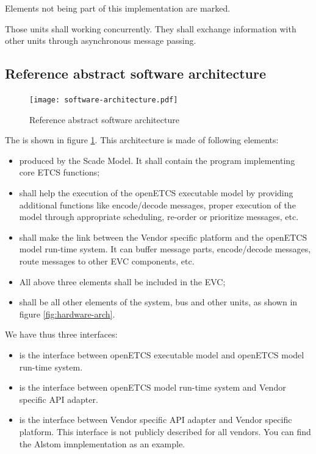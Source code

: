 \documentclass{template/openetcs_report}
\begin{document}
Elements not being part of this implementation are marked. 

Those units shall working concurrently. They shall exchange
information with other units through asynchronous message passing.

\subsection{Reference abstract software architecture}
\label{software-arch}

\begin{figure}[htbp]
  \centering
  \texttt{[image: software-architecture.pdf]}
  \caption{Reference abstract software architecture}
  \label{fig:software-arch}
\end{figure}

The  is shown in figure
\ref{fig:software-arch}. This architecture is made of following
elements:
\begin{itemize}
\item {} produced by the
  \cite{scade-model} Scade Model. It shall contain the program implementing core
  ETCS functions;
\item{} shall help the execution
  of the openETCS executable model by providing additional functions
  like encode/decode messages, proper execution of the model through
  appropriate scheduling, re-order or prioritize messages, etc. 
\item {} shall make the link between
  the Vendor specific platform and the openETCS model run-time system.
  It can buffer message parts, encode/decode messages, route messages
  to other \gls{EVC} components, etc.
\item All above three elements shall be included in the \gls{EVC};
\item {} shall be all other elements of
  the system, bus and other units, as shown in figure
  \ref{fig:hardware-arch}.
\end{itemize}

We have thus three interfaces:
\begin{itemize}
\item {}
 is the interface between openETCS
  executable model and openETCS model run-time system. 
\item {}
 is the interface between openETCS model
  run-time system and Vendor specific \gls{API} adapter.
\item {}
 is the interface between Vendor
  specific \gls{API} adapter and Vendor specific platform. This interface is
  not publicly described for all vendors. You can find the Alstom imnplementation as an example.
\end{itemize}
\end{document}
